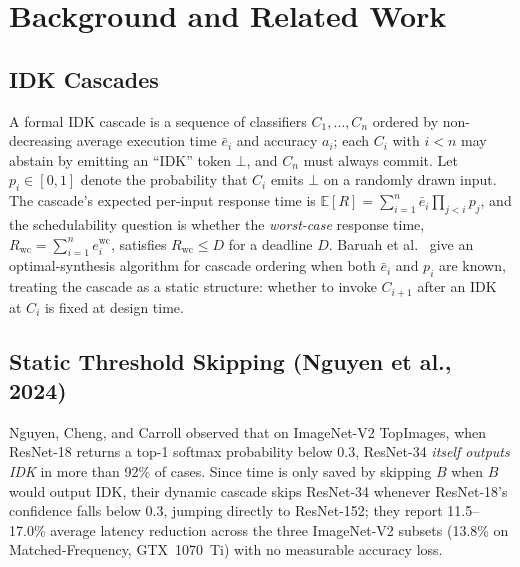 \documentclass[conference]{IEEEtran}
\begin{document}
\section{Background and Related Work}
\label{sec:related}

\subsection{IDK Cascades}
A formal IDK cascade \cite{baruah2023optimal} is a sequence of classifiers $C_1, \dots, C_n$ ordered by non-decreasing average execution time $\bar{e}_i$ and accuracy $a_i$; each $C_i$ with $i < n$ may abstain by emitting an ``IDK'' token $\bot$, and $C_n$ must always commit. Let $p_i \in [0,1]$ denote the probability that $C_i$ emits $\bot$ on a randomly drawn input. The cascade's expected per-input response time is $\mathbb{E}[R] = \sum_{i=1}^{n} \bar{e}_i \prod_{j<i} p_j$, and the schedulability question is whether the \emph{worst-case} response time, $R_{\text{wc}} = \sum_{i=1}^{n} e_i^{\text{wc}}$, satisfies $R_{\text{wc}} \le D$ for a deadline $D$. Baruah et al.\ \cite{baruah2023optimal} give an optimal-synthesis algorithm for cascade ordering when both $\bar{e}_i$ and $p_i$ are known, treating the cascade as a static structure: whether to invoke $C_{i+1}$ after an IDK at $C_i$ is fixed at design time.

\subsection{Static Threshold Skipping (Nguyen et al., 2024)}
Nguyen, Cheng, and Carroll \cite{nguyen2024probabilistic} observed that on ImageNet-V2 TopImages, when ResNet-18 returns a top-1 softmax probability below 0.3, ResNet-34 \emph{itself outputs IDK} in more than 92\% of cases. Since time is only saved by skipping $B$ when $B$ would output IDK, their dynamic cascade skips ResNet-34 whenever ResNet-18's confidence falls below 0.3, jumping directly to ResNet-152; they report 11.5--17.0\% average latency reduction across the three ImageNet-V2 subsets (13.8\% on Matched-Frequency, GTX~1070~Ti) with no measurable accuracy loss.
\end{document}
